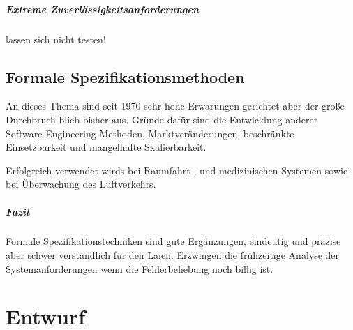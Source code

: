 
\paragraph{Extreme Zuverlässigkeitsanforderungen} lassen sich nicht testen!

\section{Formale Spezifikationsmethoden}
An dieses Thema sind seit 1970 sehr hohe Erwarungen gerichtet aber der große Durchbruch blieb bisher aus. Gründe dafür sind die Entwicklung anderer Software-Engineering-Methoden, Marktveränderungen, beschränkte Einsetzbarkeit und mangelhafte Skalierbarkeit. 

Erfolgreich verwendet wirds bei Raumfahrt-, und medizinischen Systemen sowie bei Überwachung des Luftverkehrs. 


\paragraph{Fazit}
Formale Spezifikationstechniken sind gute Ergänzungen, eindeutig und präzise aber schwer verständlich für den Laien. Erzwingen die frühzeitige Analyse der Systemanforderungen wenn die Fehlerbehebung noch billig ist.

\chapter{Entwurf}













